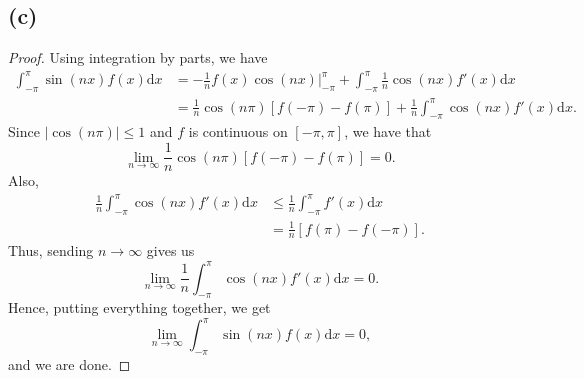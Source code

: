 \documentclass{article}
\begin{document}
\subsection*{(c)}
\begin{proof}
	Using integration by parts, we have
	\begin{align}
		\int_{-\pi}^\pi \sin(nx) f(x) \mathrm{d}x &= -\frac{1}{n}f(x) \cos(nx)\big|_{-\pi}^\pi + \int_{-\pi}^\pi \frac{1}{n}\cos(nx)f'(x) \mathrm{d}x \\
		&= \frac{1}{n}\cos(n\pi)\left[f(-\pi) - f(\pi)\right] + \frac{1}{n} \int_{-\pi}^\pi \cos(nx)f'(x)\mathrm{d}x.
	\end{align}
	Since $|\cos(n\pi)| \leq 1$ and $f$ is continuous on $[-\pi, \pi]$, we have that 
	\begin{equation}
		\lim\limits_{n \to \infty} \frac{1}{n} \cos(n\pi) \left[f(-\pi) - f(\pi)\right] = 0.
	\end{equation}
	Also,
	\begin{align}
		\frac{1}{n}\int_{-\pi}^\pi \cos(nx) f'(x) \mathrm{d}x &\leq \frac{1}{n} \int_{-\pi}^\pi f'(x) \mathrm{d}x \\
		&= \frac{1}{n}\left[f(\pi) - f(-\pi)\right].
	\end{align}
	Thus, sending $n \to \infty$ gives us
	\begin{equation}
		\lim\limits_{n \to \infty} \frac{1}{n} \int_{-\pi}^\pi \cos(nx) f'(x) \mathrm{d}x = 0.
	\end{equation}
	Hence, putting everything together, we get
	\begin{equation}
		\lim\limits_{n \to \infty} \int_{-\pi}^\pi \sin(nx) f(x) \mathrm{d}x = 0,
	\end{equation}
	and we are done.
\end{proof}
\end{document}
